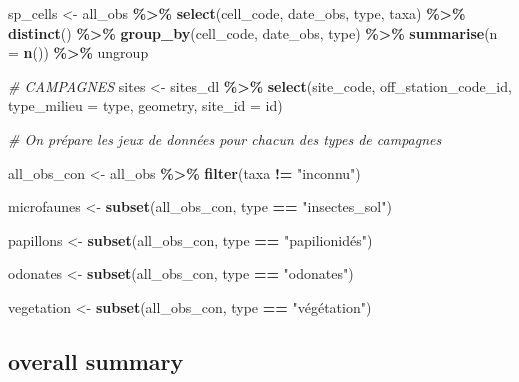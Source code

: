 \documentclass[
]{book}
\newenvironment{Shaded}{\begin{snugshade}}{\end{snugshade}}
\newcommand{\CommentTok}[1]{\textcolor[rgb]{0.56,0.35,0.01}{\textit{#1}}}
\newcommand{\DataTypeTok}[1]{\textcolor[rgb]{0.13,0.29,0.53}{#1}}
\newcommand{\KeywordTok}[1]{\textcolor[rgb]{0.13,0.29,0.53}{\textbf{#1}}}
\newcommand{\NormalTok}[1]{#1}
\newcommand{\OperatorTok}[1]{\textcolor[rgb]{0.81,0.36,0.00}{\textbf{#1}}}
\newcommand{\StringTok}[1]{\textcolor[rgb]{0.31,0.60,0.02}{#1}}
\begin{document}
\begin{Shaded}
\begin{Highlighting}[]
\NormalTok{sp\_cells \textless{}{-}}\StringTok{  }\NormalTok{all\_obs }\OperatorTok{\%\textgreater{}\%}\StringTok{ }
\StringTok{  }\KeywordTok{select}\NormalTok{(cell\_code, date\_obs, type, taxa) }\OperatorTok{\%\textgreater{}\%}\StringTok{ }
\StringTok{  }\KeywordTok{distinct}\NormalTok{() }\OperatorTok{\%\textgreater{}\%}\StringTok{ }
\StringTok{  }\KeywordTok{group\_by}\NormalTok{(cell\_code, date\_obs, type) }\OperatorTok{\%\textgreater{}\%}
\StringTok{  }\KeywordTok{summarise}\NormalTok{(}\DataTypeTok{n =} \KeywordTok{n}\NormalTok{()) }\OperatorTok{\%\textgreater{}\%}\StringTok{ }
\StringTok{  }\NormalTok{ungroup}

\CommentTok{\# CAMPAGNES}
\NormalTok{sites \textless{}{-}}\StringTok{ }\NormalTok{sites\_dl }\OperatorTok{\%\textgreater{}\%}\StringTok{ }
\StringTok{  }\KeywordTok{select}\NormalTok{(site\_code, off\_station\_code\_id,}
         \DataTypeTok{type\_milieu =}\NormalTok{ type, geometry, }\DataTypeTok{site\_id =}\NormalTok{ id)}

\CommentTok{\# On prépare les jeux de données pour chacun des types de campagnes}

\NormalTok{all\_obs\_con \textless{}{-}}\StringTok{  }\NormalTok{all\_obs }\OperatorTok{\%\textgreater{}\%}
\StringTok{  }\KeywordTok{filter}\NormalTok{(taxa }\OperatorTok{!=}\StringTok{ "inconnu"}\NormalTok{)}

\NormalTok{microfaunes \textless{}{-}}\StringTok{ }\KeywordTok{subset}\NormalTok{(all\_obs\_con, type }\OperatorTok{==}\StringTok{ "insectes\_sol"}\NormalTok{)}

\NormalTok{papillons \textless{}{-}}\StringTok{ }\KeywordTok{subset}\NormalTok{(all\_obs\_con, type }\OperatorTok{==}\StringTok{ "papilionidés"}\NormalTok{)}

\NormalTok{odonates \textless{}{-}}\StringTok{ }\KeywordTok{subset}\NormalTok{(all\_obs\_con, type }\OperatorTok{==}\StringTok{ "odonates"}\NormalTok{)}

\NormalTok{vegetation \textless{}{-}}\StringTok{ }\KeywordTok{subset}\NormalTok{(all\_obs\_con, type }\OperatorTok{==}\StringTok{ "végétation"}\NormalTok{)}
\end{Highlighting}
\end{Shaded}

\hypertarget{overall-summary}{%
\subsection{overall summary}\label{overall-summary}}
\end{document}
